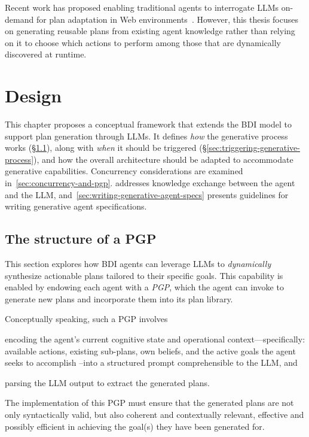 \documentclass[12pt,a4paper,openright,twoside]{book}
\begin{document}
Recent work has proposed enabling traditional agents to interrogate \acp{LLM} on-demand for plan adaptation in Web environments~\cite{schmid2024kgswc}. 
%
However, this thesis focuses on generating reusable plans from existing agent knowledge rather than relying on it to choose which actions to perform among those that are dynamically discovered at runtime.

\chapter{Design}\label{chap:design}

This chapter proposes a conceptual framework that extends the \ac{BDI} model to support plan generation through \acp{LLM}. 
%
It defines \emph{how} the generative process works (§\ref{sec:pgp-structure}), along with \emph{when} it should be triggered (§\ref{sec:triggering-generative-process}), and how the overall \agentspeak{} architecture should be adapted to accommodate generative capabilities.
%
Concurrency considerations are examined in~\cref{sec:concurrency-and-pgp}.
%
 addresses knowledge exchange between the agent and the \ac{LLM}, and~\cref{sec:writing-generative-agent-specs} presents guidelines for writing generative agent specifications.

\section{The structure of a PGP}\label{sec:pgp-structure}

This section explores how \ac{BDI} agents can leverage \acp{LLM} to \emph{dynamically} synthesize actionable plans tailored to their specific goals. 
%
This capability is enabled by endowing each agent with a \emph{\acf{PGP}}, which the agent can invoke to generate new plans and incorporate them into its plan library.

Conceptually speaking, such a \ac{PGP} involves
%
\begin{inlinelist}
    \item encoding the agent's current cognitive state and operational context---specifically: available actions, existing sub-plans, own beliefs, and the active goals the agent seeks to accomplish --into a structured prompt comprehensible to the \ac{LLM}, and 
    \item parsing the \ac{LLM} output to extract the generated plans.
\end{inlinelist}
%
The implementation of this \ac{PGP} must ensure that the generated plans are not only syntactically valid, but also coherent and contextually relevant, effective and possibly efficient in achieving the goal(s) they have been generated for.
\end{document}
